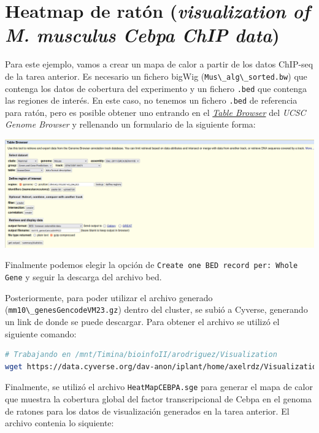 \documentclass[
]{article}
\newcommand{\passthrough}[1]{#1}
\begin{document}
\hypertarget{heatmap-de-ratuxf3n-visualization-of-m.-musculus-cebpa-chip-data}{%
\section{\texorpdfstring{Heatmap de ratón (\emph{visualization of M.
musculus Cebpa ChIP
data})}{Heatmap de ratón (visualization of M. musculus Cebpa ChIP data)}}\label{heatmap-de-ratuxf3n-visualization-of-m.-musculus-cebpa-chip-data}}

Para este ejemplo, vamos a crear un mapa de calor a partir de los datos
ChIP-seq de la tarea anterior. Es necesario un fichero bigWig
(\passthrough{\lstinline!Mus\_alg\_sorted.bw!}) que contenga los datos
de cobertura del experimento y un fichero \passthrough{\lstinline!.bed!}
que contenga las regiones de interés. En este caso, no tenemos un
fichero \passthrough{\lstinline!.bed!} de referencia para ratón, pero es
posible obtener uno entrando en el
\emph{\href{https://genome.ucsc.edu/cgi-bin/hgTables}{Table Browser}}
del \emph{UCSC Genome Browser} y rellenando un formulario de la
siguiente forma:

\includegraphics{./T04_images/TableBrowser.png}

Finalmente podemos elegir la opción de
\passthrough{\lstinline!Create one BED record per: Whole Gene!} y seguir
la descarga del archivo bed.

Posteriormente, para poder utilizar el archivo generado
(\passthrough{\lstinline!mm10\_genesGencodeVM23.gz!}) dentro del
cluster, se subió a Cyverse, generando un link de donde se puede
descargar. Para obtener el archivo se utilizó el siguiente comando:

\begin{lstlisting}[language=bash]
# Trabajando en /mnt/Timina/bioinfoII/arodriguez/Visualization
wget https://data.cyverse.org/dav-anon/iplant/home/axelrdz/Visualization/mm10_genesGencodeVM23.gz
\end{lstlisting}

Finalmente, se utilizó el archivo
\passthrough{\lstinline!HeatMapCEBPA.sge!} para generar el mapa de calor
que muestra la cobertura global del factor transcripcional de Cebpa en
el genoma de ratones para los datos de visualización generados en la
tarea anterior. El archivo contenia lo siquiente:
\end{document}
